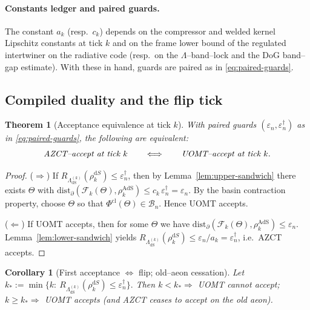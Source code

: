 \documentclass[10pt]{article}
\theoremstyle{definition}
\theoremstyle{plain}
\newtheorem{theorem}{Theorem}[section]
\newtheorem{corollary}{Corollary}[section]
\begin{document}
\paragraph{Constants ledger and paired guards.}\label{par:uom-main-204}
The constant $a_k$ (resp.\ $c_k$) depends on the compressor and welded kernel Lipschitz constants at tick $k$ and on the frame lower bound of the regulated intertwiner on the radiative code (resp.\ on the $\Lambda$--band--lock and the DoG band--gap estimate).
With these in hand, guards are paired as in \eqref{eq:paired-guards}.

\subsection{Compiled duality and the flip tick}
\label{subsec:compiled-duality-final}

\begin{theorem}[Acceptance equivalence at tick $k$]
\label{thm:equivalence-8}
With paired guards $(\varepsilon_n,\varepsilon_n^\dagger)$ as in \eqref{eq:paired-guards}, the following are equivalent:
\[
\text{\emph{AZCT--accept at tick $k$}}\qquad\Longleftrightarrow\qquad \text{\emph{UOMT--accept at tick $k$}} .
\]
\end{theorem}

\begin{proof}
($\Rightarrow$) If $R_{\Lambda^{(k)}_{\mathrm{dS}}}(\rho_k^{\mathrm dS})\le \varepsilon_n^\dagger$, then by Lemma~\ref{lem:upper-sandwich} there exists $\Theta$ with $\mathrm{dist}_\partial(\mathcal F_k(\Theta),\rho_k^{\mathrm{AdS}})\le c_k\,\varepsilon_n^\dagger=\varepsilon_n$.
By the basin contraction property, choose $\Theta$ so that $\Phi^{\mathrm{cl}}(\Theta)\in \mathcal B_n$. Hence UOMT accepts.

($\Leftarrow$) If UOMT accepts, then for some $\Theta$ we have $\mathrm{dist}_\partial(\mathcal F_k(\Theta),\rho_k^{\mathrm{AdS}})\le \varepsilon_n$.
Lemma~\ref{lem:lower-sandwich} yields $R_{\Lambda^{(k)}_{\mathrm{dS}}}(\rho_k^{\mathrm dS})\le \varepsilon_n/a_k=\varepsilon_n^\dagger$, i.e.\ AZCT accepts.
\end{proof}

\begin{corollary}[First acceptance $\Leftrightarrow$ flip; old--aeon cessation]
\label{cor:first-flip-8}
Let
\(
k_\ast:=\min\{k:\ R_{\Lambda^{(k)}_{\mathrm{dS}}}(\rho_k^{\mathrm dS})\le \varepsilon_n^\dagger\}.
\)
Then $k<k_\ast\Rightarrow$ UOMT cannot accept; $k\ge k_\ast\Rightarrow$ UOMT accepts (and AZCT ceases to accept on the old aeon).
\end{corollary}
\end{document}
